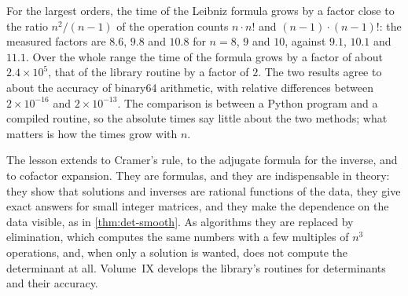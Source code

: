 For the largest orders, the time of the Leibniz formula grows by a factor close to the ratio $n^2/(n-1)$ of the operation counts $n\cdot n!$ and $(n-1)\cdot(n-1)!$: the measured factors are $8.6$, $9.8$ and $10.8$ for $n=8$, $9$ and $10$, against $9.1$, $10.1$ and $11.1$. Over the whole range the time of the formula grows by a factor of about $2.4\times10^5$, that of the library routine by a factor of $2$. The two results agree to about the accuracy of binary64 arithmetic, with relative differences between $2\times10^{-16}$ and $2\times10^{-13}$. The comparison is between a Python program and a compiled routine, so the absolute times say little about the two methods; what matters is how the times grow with $n$.

The lesson extends to Cramer's rule, to the adjugate formula for the inverse, and to cofactor expansion. They are formulas, and they are indispensable in theory: they show that solutions and inverses are rational functions of the data, they give exact answers for small integer matrices, and they make the dependence on the data visible, as in \cref{thm:det-smooth}. As algorithms they are replaced by elimination, which computes the same numbers with a few multiples of $n^3$ operations, and, when only a solution is wanted, does not compute the determinant at all. Volume~IX develops the library's routines for determinants and their accuracy.

